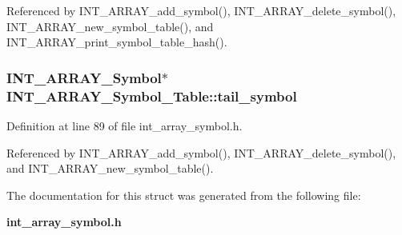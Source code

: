 Referenced by INT\_\-ARRAY\_\-add\_\-symbol(), INT\_\-ARRAY\_\-delete\_\-symbol(), INT\_\-ARRAY\_\-new\_\-symbol\_\-table(), and INT\_\-ARRAY\_\-print\_\-symbol\_\-table\_\-hash().
\subsubsection{\setlength{\rightskip}{0pt plus 5cm}\bf{INT\_\-ARRAY\_\-Symbol}$\ast$ \bf{INT\_\-ARRAY\_\-Symbol\_\-Table::tail\_\-symbol}}\label{structINT__ARRAY__Symbol__Table_b61d8ea276fe637d56a597f7c966f5ce}




Definition at line 89 of file int\_\-array\_\-symbol.h.

Referenced by INT\_\-ARRAY\_\-add\_\-symbol(), INT\_\-ARRAY\_\-delete\_\-symbol(), and INT\_\-ARRAY\_\-new\_\-symbol\_\-table().

The documentation for this struct was generated from the following file:\begin{CompactItemize}
\item 
\bf{int\_\-array\_\-symbol.h}\end{CompactItemize}
